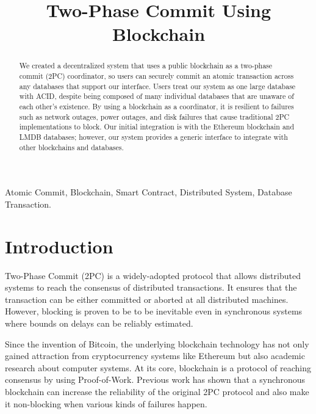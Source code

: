 \documentclass[11pt,conference]{IEEEtran}
\begin{document}
\title{Two-Phase Commit Using Blockchain}

\author{
  \and
  \and
}

\maketitle

\begin{abstract}
  We created a decentralized system that uses a public blockchain as a two-phase commit (2PC) coordinator, so users can securely commit an atomic transaction across any databases that support our interface. Users treat our system as one large database with ACID, despite being composed of many individual databases that are unaware of each other’s existence. By using a blockchain as a coordinator, it is resilient to failures such as network outages, power outages, and disk failures that cause traditional 2PC implementations to block. Our initial integration is with the Ethereum blockchain and LMDB databases; however, our system provides a generic interface to integrate with other blockchains and databases.
\end{abstract}

\begin{IEEEkeywords}
  Atomic Commit, Blockchain, Smart Contract, Distributed System, Database Transaction.
\end{IEEEkeywords}

\section{Introduction}
Two-Phase Commit (2PC) is a widely-adopted protocol that allows distributed systems to reach the consensus of distributed transactions. It ensures that the transaction can be either committed or aborted at all distributed machines. However, blocking is proven \cite{ezhilchelvan2020non} to be to be inevitable even in synchronous systems where bounds on delays can be reliably estimated. 

Since the invention of Bitcoin, the underlying blockchain technology has not only gained attraction from  cryptocurrency systems like Ethereum \cite{} but also academic research about computer systems. At its core, blockchain  is a protocol of reaching consensus by using Proof-of-Work. Previous work \cite{} has shown that a synchronous blockchain can increase the reliability of the original 2PC protocol and also make it non-blocking when various kinds of failures happen.
\end{document}
